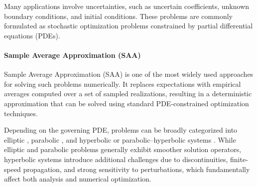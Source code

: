 \documentclass{article}
\newcommand{\1}{\mathds{1}}          %
\theoremstyle{definition}
\begin{document}
\begin{sloppypar}
Many applications involve uncertainties, such as uncertain coefficients, unknown boundary conditions, and initial conditions. These problems are commonly formulated as stochastic optimization problems constrained by partial differential equations (PDEs). 

\paragraph{Sample Average Approximation (SAA)}
Sample Average Approximation (SAA) is one of the most widely used approaches for solving such problems numerically. It replaces expectations with empirical averages computed over a set of sampled realizations, resulting in a deterministic approximation that can be solved using standard PDE-constrained optimization techniques.

Depending on the governing PDE, problems can be broadly categorized into elliptic \cite{kouri2013trust,kouri2014inexact,rosseel2012optimal}, parabolic \cite{Borzi2009,Cao2022,Guth2024}, and hyperbolic or parabolic--hyperbolic systems \cite{Esmaili2023}. While elliptic and parabolic problems generally exhibit smoother solution operators, hyperbolic systems introduce additional challenges due to discontinuities, finite-speed propagation, and strong sensitivity to perturbations, which fundamentally affect both analysis and numerical optimization.


\end{sloppypar}
\end{document}
